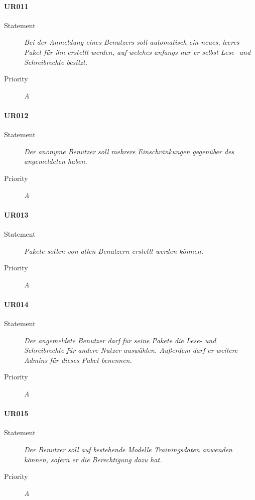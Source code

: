 \paragraph{UR011}
\begin{description}
\item[Statement] \textit{Bei der Anmeldung eines Benutzers soll automatisch ein neues, leeres \gls{Paket} für ihn erstellt werden, auf welches anfangs nur er selbst Lese- und Schreibrechte besitzt.}
\item[Priority] \textit{A}
\end{description}

\paragraph{UR012}
\begin{description}
\item[Statement] \textit{Der anonyme Benutzer soll mehrere Einschränkungen gegenüber des angemeldeten haben.}
\item[Priority] \textit{A}
\end{description}

\paragraph{UR013}
\begin{description}
\item[Statement] \textit{\gls{Paket}e sollen von allen Benutzern erstellt werden können.}
\item[Priority] \textit{A}
\end{description}

\paragraph{UR014}
\begin{description}
\item[Statement] \textit{Der angemeldete Benutzer darf für seine \gls{Paket}e die Lese- und Schreibrechte für andere Nutzer auswählen. Außerdem darf er weitere Admins für dieses \gls{Paket} benennen.}
\item[Priority] \textit{A}
\end{description}

\paragraph{UR015}
\begin{description}
  \item[Statement]
    \textit{Der Benutzer soll auf bestehende Modelle Trainingsdaten anwenden können, sofern er die Berechtigung dazu hat.}
  \item[Priority]
    \textit{A}
\end{description}

